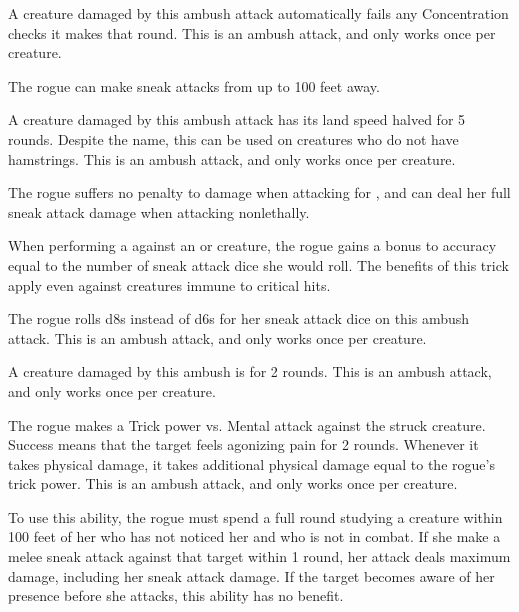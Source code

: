         A creature damaged by this ambush attack automatically fails any Concentration checks it makes that round.
        This is an ambush attack, and only works once per creature.

        The rogue can make sneak attacks from up to 100 feet away.

        A creature damaged by this ambush attack has its land speed halved for 5 rounds.
        Despite the name, this can be used on creatures who do not have hamstrings.
        This is an ambush attack, and only works once per creature.

        The rogue suffers no penalty to damage when attacking for , and can deal her full sneak attack damage when attacking nonlethally.


        When performing a  against an  or \unaware creature, the rogue gains a bonus to accuracy equal to the number of sneak attack dice she would roll.
        The benefits of this trick apply even against creatures immune to critical hits.

        The rogue rolls d8s instead of d6s for her sneak attack dice on this ambush attack.
        This is an ambush attack, and only works once per creature.

        A creature damaged by this ambush is \immobilized for 2 rounds.
        This is an ambush attack, and only works once per creature.

        The rogue makes a Trick power vs. Mental attack against the struck creature.
        Success means that the target feels agonizing pain for 2 rounds.
        Whenever it takes physical damage, it takes additional physical damage equal to the rogue's trick power.
        This is an ambush attack, and only works once per creature.

        To use this ability, the rogue must spend a full round studying a creature within 100 feet of her who has not noticed her and who is not in combat.
        If she make a melee sneak attack against that target within 1 round, her attack deals maximum damage, including her sneak attack damage.
        If the target becomes aware of her presence before she attacks, this ability has no benefit.

